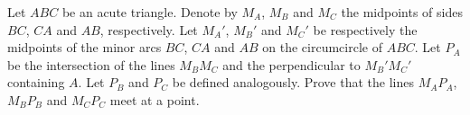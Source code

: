 Let $ABC$ be an acute triangle.
Denote by $M_A$, $M_B$ and $M_C$ the midpoints of sides $BC$, $CA$ and $AB$, respectively.
Let $M_A'$, $M_B'$ and $M_C'$ be respectively the midpoints of
the minor arcs $BC$, $CA$ and $AB$ on the circumcircle of $ABC$.
Let $P_A$ be the intersection of the lines $M_BM_C$ and the perpendicular to $M_B'M_C'$ containing $A$.
Let $P_B$ and $P_C$ be defined analogously.
Prove that the lines $M_AP_A$, $M_BP_B$ and $M_CP_C$ meet at a point.
